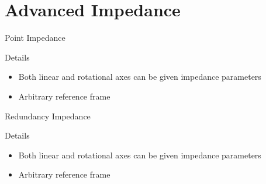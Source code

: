 \documentclass{beamer}
\begin{document}
\section{Advanced Impedance}

\begin{frame}{Point Impedance}

  \begin{block}{Details}
    \begin{itemize}
      \item Both linear and rotational axes can be given impedance parameters
      \item Arbitrary reference frame
    \end{itemize}
  \end{block}
\end{frame}

\begin{frame}{Redundancy Impedance}

  \begin{block}{Details}
    \begin{itemize}
      \item Both linear and rotational axes can be given impedance parameters
      \item Arbitrary reference frame
    \end{itemize}
  \end{block}
\end{frame}
\end{document}
